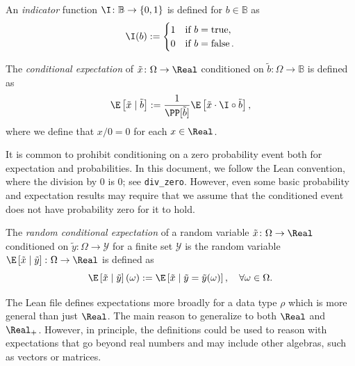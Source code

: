 \begin{definition} \label{def:indicator}
An \emph{indicator} function $\I \colon \mathbb{B} \to \left\{ 0, 1 \right\}$ is defined for $b\in \mathbb{B}$ as
\[
\I(b) :=
\begin{cases}
1 &\text{if } b = \operatorname{true}, \\
0 &\text{if } b = \operatorname{false}.
\end{cases}
\]
\end{definition}

\begin{definition} \label{def:expect-cnd}
The \emph{conditional expectation} of $\tilde{x} \colon \Omega \to \Real$ conditioned on $\tilde{b} \colon \Omega \to \mathbb{B}$ is defined as
\[
\E \left[ \tilde{x} \mid  \tilde{b} \right] :=
\frac{1}{\PP[\tilde{b}]} \E \left[  \tilde{x} \cdot \I \circ \tilde{b} \right],
\]
where we define that $x / 0 = 0$ for each $x\in \Real$.
\end{definition}


\begin{remark}
It is common to prohibit conditioning on a zero probability event both for expectation and probabilities. In this document, we follow the Lean convention, where the division by $0$ is $0$; see \texttt{div\_zero}. However, even some basic probability and expectation results may require that we assume that the conditioned event does not have probability zero for it to hold. 
\end{remark}

\begin{definition} \label{def:expect-cnd-rv}
The \emph{random conditional expectation} of a random variable $\tilde{x} \colon \Omega \to \Real$ conditioned on $\tilde{y} \colon \Omega \to \mathcal{Y}$ for a finite set $\mathcal{Y}$ is the random variable $\E \left[ \tilde{x} \mid  \tilde{y} \right]\colon \Omega \to \Real$ is defined as
\[
\E \left[ \tilde{x} \mid  \tilde{y} \right](\omega)
:=
\E \left[ \tilde{x} \mid  \tilde{y} = \tilde{y}(\omega) \right], \quad \forall \omega \in \Omega.
\]
\end{definition}

\begin{remark}
The Lean file defines expectations more broadly for a data type $\rho$ which is more general than just $\Real$. The main reason to generalize to both $\Real$ and $\Real_+$. However, in principle, the definitions could be used to reason with expectations that go beyond real numbers and may include other algebras, such as vectors or matrices.
\end{remark}


